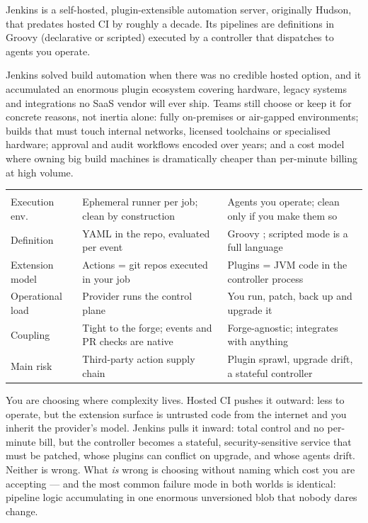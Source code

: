 
 Jenkins is a self-hosted, plugin-extensible automation server, originally Hudson, that predates hosted CI by roughly a decade. Its pipelines are  definitions in Groovy (declarative or scripted) executed by a controller that dispatches to agents you operate.

 Jenkins solved build automation when there was no credible hosted option, and it accumulated an enormous plugin ecosystem covering hardware, legacy systems and integrations no SaaS vendor will ever ship. Teams still choose or keep it for concrete reasons, not inertia alone: fully on-premises or air-gapped environments; builds that must touch internal networks, licensed toolchains or specialised hardware; approval and audit workflows encoded over years; and a cost model where owning big build machines is dramatically cheaper than per-minute billing at high volume.

\begin{center}\small
\wbrowcolors
\begin{tabularx}{\linewidth}{@{}L{26mm} X X@{}}
 &  & \\
Execution env. & Ephemeral runner per job; clean by construction & Agents you operate; clean only if you make them so\\
Definition & YAML in the repo, evaluated per event & Groovy ; scripted mode is a full language\\
Extension model & Actions = git repos executed in your job & Plugins = JVM code in the controller process\\
Operational load & Provider runs the control plane & You run, patch, back up and upgrade it\\
Coupling & Tight to the forge; events and PR checks are native & Forge-agnostic; integrates with anything\\
Main risk & Third-party action supply chain & Plugin sprawl, upgrade drift, a stateful controller\\
\end{tabularx}
\end{center}

\begin{tradeoff}
You are choosing where complexity lives. Hosted CI pushes it outward: less to operate, but the extension surface is untrusted code from the internet and you inherit the provider's model. Jenkins pulls it inward: total control and no per-minute bill, but the controller becomes a stateful, security-sensitive service that must be patched, whose plugins can conflict on upgrade, and whose agents drift. Neither is wrong. What \emph{is} wrong is choosing without naming which cost you are accepting --- and the most common failure mode in both worlds is identical: pipeline logic accumulating in one enormous unversioned blob that nobody dares change.
\end{tradeoff}


